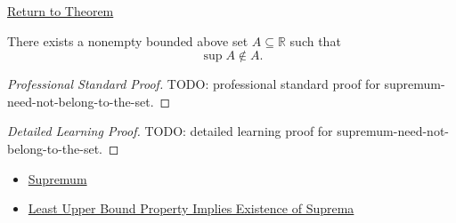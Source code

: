 \newpage
{}
\label{prf:supremum-need-not-belong-to-the-set}

\begin{remark*}[Return]
\hyperref[prop:supremum-need-not-belong-to-the-set]{Return to Theorem}
\end{remark*}

\begin{proposition*}
There exists a nonempty bounded above set $A\subseteq\mathbb{R}$ such that
\[
\sup A\notin A.
\]
\end{proposition*}

\begin{proof}[Professional Standard Proof]
\LRAProofBodyStart
TODO: professional standard proof for supremum-need-not-belong-to-the-set.
\end{proof}

\begin{proof}[Detailed Learning Proof]
\LRAProofBodyStart
TODO: detailed learning proof for supremum-need-not-belong-to-the-set.
\end{proof}

\begin{remark*}
\end{remark*}

\begin{dependencies}
\begin{itemize}
  \item \hyperref[def:supremum]{Supremum}
  \item \hyperref[thm:lub-property-implies-existence-of-suprema]{Least Upper Bound Property Implies Existence of Suprema}
\end{itemize}
\end{dependencies}

\clearpage
